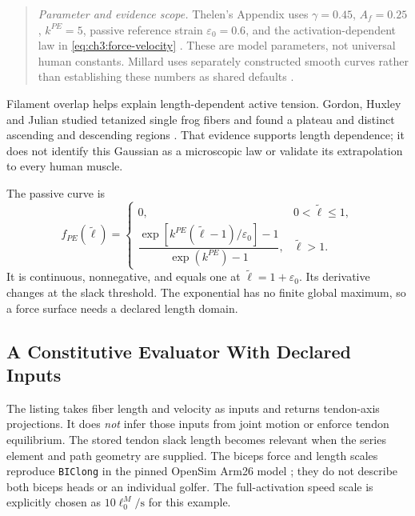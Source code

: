 \begin{quote}
  \textit{Parameter and evidence scope.}
  Thelen's Appendix uses
  $\gamma=0.45$, $A_f=0.25$, $k^{PE}=5$, passive reference strain $\varepsilon_0=0.6$,
  and the activation-dependent law in \eqref{eq:ch3:force-velocity}
  \cite{Thelen2003}.
  These are model parameters, not universal human constants. Millard uses
  separately constructed smooth curves rather than establishing these
  numbers as shared defaults \cite{millard2013flexing}.
\end{quote}

Filament overlap helps explain length-dependent active tension. Gordon,
Huxley and Julian studied tetanized single frog fibers and found a plateau
and distinct ascending and descending regions \cite{GordonHuxleyJulian1966}.
That evidence supports length dependence; it does not identify this Gaussian
as a microscopic law or validate its extrapolation to every human muscle.

The passive curve is
\begin{equation}
 f_{PE}(\tilde{\ell})=
 \begin{cases}
 0,&0<\tilde{\ell}\leq1,\\
 \dfrac{\exp[k^{PE}(\tilde{\ell}-1)/\varepsilon_0]-1}
       {\exp(k^{PE})-1},&\tilde{\ell}>1.
 \end{cases}
 \label{eq:ch3:passive-force}
\end{equation}
It is continuous, nonnegative, and equals one at
$\tilde{\ell}=1+\varepsilon_0$. Its derivative changes at the slack threshold.
The exponential has no finite global maximum, so a force surface needs a
declared length domain.

\subsection{A Constitutive Evaluator With Declared Inputs}

The listing takes fiber length and velocity as inputs and returns tendon-axis
projections. It does \emph{not} infer those inputs from joint motion or enforce
tendon equilibrium. The stored tendon slack length becomes relevant when
the series element and path geometry are supplied. The biceps force and length
scales reproduce \texttt{BIClong} in the pinned OpenSim Arm26 model
\cite{OpenSimArm26Pinned}; they do not describe both biceps heads or an
individual golfer. The full-activation speed scale is explicitly chosen as
$10\ell_0^M/\mathrm{s}$ for this example.

